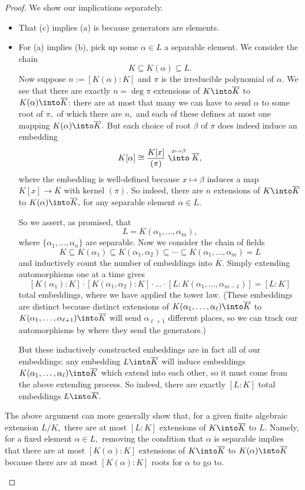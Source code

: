\begin{proof}
	We show our implications separately.
	\begin{itemize}
		\item That (c) implies (a) is because generators are elements.

		\item For (a) implies (b), pick up some $\alpha\in L$ a separable element. We consider the chain
		\[K\subseteq K(\alpha)\subseteq L.\]
		Now suppose $n:=[K(\alpha):K]$ and $\pi$ is the irreducible polynomial of $\alpha.$ We see that there are exactly $n=\deg\pi$ extensions of $K\into\overline K$ to $K(\alpha)\into\overline K$: there are at most that many we can have to send $\alpha$ to some root of $\pi,$ of which there are $n,$ and each of these defines at most one mapping $K(\alpha)\into\overline K.$ But each choice of root $\beta$ of $\pi$ does indeed induce an embedding
		\[K[\alpha]\cong\frac{K[x]}{(\pi)}\stackrel{x\mapsto\beta}\into\overline K,\]
		where the embedding is well-defined because $x\mapsto\beta$ induces a map $K[x]\to\overline K$ with kernel $(\pi).$ So indeed, there are $n$ extensions of $K\into\overline K$ to $K(\alpha)\into\overline K,$ for any separable element $\alpha\in L.$

		So we assert, as promised, that
		\[L=K(\alpha_1,\ldots,\alpha_m),\]
		where $\{\alpha_1,\ldots,\alpha_n\}$ are separable. Now we consider the chain of fields
		\[K\subseteq K(\alpha_1)\subseteq K(\alpha_1,\alpha_2)\subseteq\cdots\subseteq K(\alpha_1,\ldots,\alpha_m)=L\]
		and inductively count the number of embeddings into $\overline K.$ Simply extending automorphisms one at a time gives
		\[[K(\alpha_1):K]\cdot[K(\alpha_1,\alpha_2):K]\cdot\ldots\cdot[L:K(\alpha_1,\ldots,\alpha_{m-1})]=[L:K]\]
		total embeddings, where we have applied the tower law. (These embeddings are distinct because distinct extensions of $K(\alpha_1,\ldots,\alpha_\ell)\into\overline K$ to $K(\alpha_1,\ldots,\alpha_{\ell+1})\into\overline K$ will send $\alpha_{\ell+1}$ different places, so we can track our automorphisms by where they send the generators.)

		But these inductively constructed embeddings are in fact all of our embeddings: any embedding $L\into\overline K$ will induce embeddings $K(\alpha_1,\ldots,\alpha_\ell)\into\overline K$ which extend into each other, so it must come from the above extending process. So indeed, there are exactly $[L:K]$ total embeddings $L\into\overline K.$
	\end{itemize}
	\begin{remark} \label{rem:boundextensions}
		The above argument can more generally show that, for a given finite algebraic extension $L/K,$ there are at most $[L:K]$ extensions of $K\into\overline K$ to $L.$ Namely, for a fixed element $\alpha\in L,$ removing the condition that $\alpha$ is separable implies that there are at most $[K(\alpha):K]$ extensions of $K\into\overline K$ to $K(\alpha)\into\overline K$ because there are at most $[K(\alpha):K]$ roots for $\alpha$ to go to.
		

\end{remark}
\end{proof}
